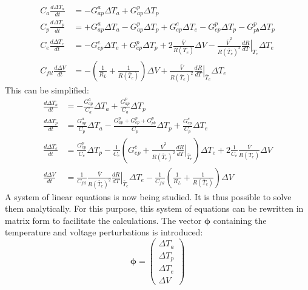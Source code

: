 \begin{align}
\label{tempo}
C_a \frac{d \Delta T_a}{d t}
	&= -G_{ap}^a \Delta T_a + G_{ap}^p \Delta T_p 
	\nonumber \\
C_p \frac{d \Delta T_p}{d t} 
	&= +G_{ap}^a \Delta T_a - G_{ap}^p \Delta T_p
	+ G_{ep}^e \Delta T_e - G_{ep}^p \Delta T_p
	- G_{pb}^p \Delta T_p
	\nonumber \\
C_e \frac{d \Delta T_e}{d t}
	&= - G_{ep}^e \Delta T_e + G_{ep}^p \Delta T_p
	+2\frac{\bar{V}}{R(\bar{T}_e)} \Delta V - \frac{\bar{V}^2}{R(\bar{T}_e)^2} \left.\frac{d R}{d T}\right\vert_{T_e} \Delta T_e
 	\nonumber \\
C_{fil} \frac{d \Delta V}{d t} &= - \left( \frac{1}{R_L} + \frac{1}{R(\bar{T}_e)} \right) \Delta V + \frac{\bar{V}}{R(\bar{T}_e)^2} \left.\frac{d R}{d T}\right\vert_{\bar{T}_e} \Delta T_e
\end{align}
This can be simplified:
\begin{align}
\label{tempo-bis}
\frac{d \Delta T_a}{d t}
	&= -\frac{G_{ap}^a}{C_a} \Delta T_a + \frac{G_{ap}^p}{C_a} \Delta T_p 
	\nonumber \\
\frac{d \Delta T_p}{d t} 
	&= \frac{G_{ap}^a}{C_p} \Delta T_a - \frac{G_{ap}^p+G_{ep}^p+G_{pb}^p}{C_p} \Delta T_p	+ \frac{G_{ep}^e }{C_p}\Delta T_e
	\nonumber \\
\frac{d \Delta T_e}{d t}
	&= \frac{G_{ep}^p}{C_e} \Delta T_p - \frac{1}{C_e} \left(G_{ep}^e + \frac{\bar{V}^2}{R(\bar{T}_e)^2} \left.\frac{d R}{d T}\right\vert_{\bar{T}_e}\right) \Delta T_e 
	+2 \frac{1}{C_e} \frac{\bar{V}}{R(\bar{T}_e)} \Delta V
 	\nonumber \\
\frac{d \Delta V}{d t} &= \frac{1}{C_{fil}} \frac{\bar{V}}{R(\bar{T}_e)^2} \left.\frac{d R}{d T}\right\vert_{\bar{T}_e} \Delta T_e - \frac{1}{C_{fil}}\left( \frac{1}{R_L} + \frac{1}{R(\bar{T}_e)} \right) \Delta V 
\end{align}
A system of linear equations is now being studied. It is thus possible to solve them analytically. For this purpose, this system of equations can be rewritten in matrix form to facilitate the calculations. The vector $\bm{\phi}$ containing the temperature and voltage perturbations is introduced:
\begin{equation}
\label{phi}
\bm{\phi} = 
\left( \begin{array}{c}
\Delta T_a\\
\Delta T_p\\
\Delta T_e\\
\Delta V
\end{array} \right)
\end{equation}
